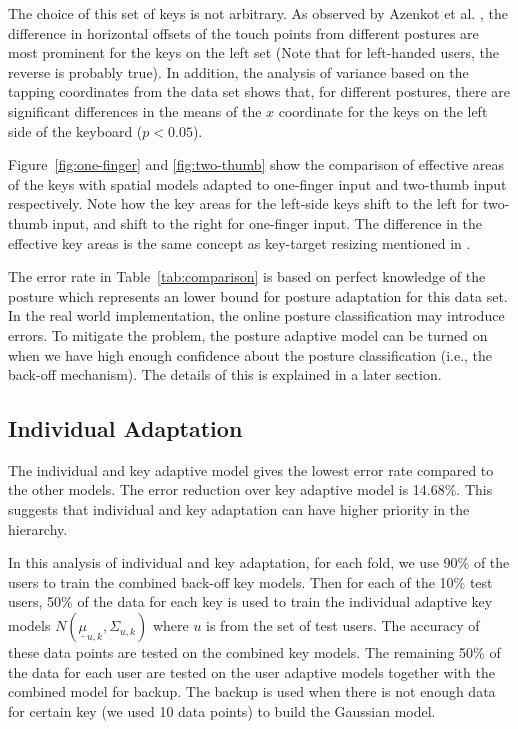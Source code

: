 \documentclass{sigchi}
\begin{document}
The choice of this set of keys is not arbitrary. As observed by Azenkot et al. \cite{Azenkot:2012}, the difference in horizontal
offsets of the touch points from different postures are most prominent for the keys on the
left set (Note that for left-handed users, the reverse is probably true). 
In addition, the analysis of variance based on the tapping coordinates from the
data set shows that, for different postures, there are significant differences in the means of
the $x$ coordinate for the keys on the left side of the keyboard ($p < 0.05$). 

Figure~\ref{fig:one-finger} and \ref{fig:two-thumb} show the comparison of effective areas of the keys
with spatial models adapted to one-finger input and two-thumb input respectively. Note how the key areas for the left-side keys shift to the left
for two-thumb input, and shift to the right for one-finger input. The difference in 
the effective key areas is the same concept as key-target resizing mentioned in \cite{Rudchenko:2011, Gunawardana:2010}.

The error rate in Table~\ref{tab:comparison} is based on perfect knowledge of
the posture which represents an lower bound for posture adaptation for this data
set. In the real world implementation, the online posture classification may
introduce errors. To mitigate the problem, the posture adaptive model can be turned on
when we have high enough confidence about the posture classification (i.e., the
back-off mechanism). The details of this is explained in a later section.

\subsection{Individual Adaptation}
The individual and key adaptive model gives the lowest error rate compared to the
other models. The error reduction over key adaptive model is 14.68\%.
This suggests that individual and key adaptation can have higher priority in the hierarchy. 

In this analysis of individual and key adaptation, for each fold, we use 90\% of the
users to train the combined back-off key models. Then for each of the 10\% test users,
50\% of the data for each key is used to train the individual adaptive
key models $N(\underline \mu_{u, k}, \Sigma_{u, k})$ where $u$ is from the set
of test users.
The accuracy of these data points are tested on the combined key models.
The remaining 50\% of the data for each user are tested on the user adaptive 
models together with the combined model for backup. The backup is used when 
there is not enough data for certain key (we used 10 data points) to build the 
Gaussian model. 
\end{document}
